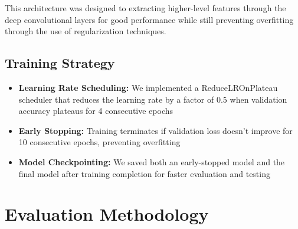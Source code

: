 \documentclass[10pt]{article}
\begin{document}
This architecture was designed to extracting higher-level features through the deep convolutional layers for good performance while still preventing overfitting through the use of regularization techniques.

\subsection{Training Strategy}

\begin{itemize}
    \item \textbf{Learning Rate Scheduling:} We implemented a ReduceLROnPlateau scheduler that reduces the learning rate by a factor of 0.5 when validation accuracy plateaus for 4 consecutive epochs
    
    \item \textbf{Early Stopping:} Training terminates if validation loss doesn't improve for 10 consecutive epochs, preventing overfitting
    
    \item \textbf{Model Checkpointing:} We saved both an early-stopped model and the final model after training completion for faster evaluation and testing
\end{itemize}




\section{Evaluation Methodology}
\end{document}
